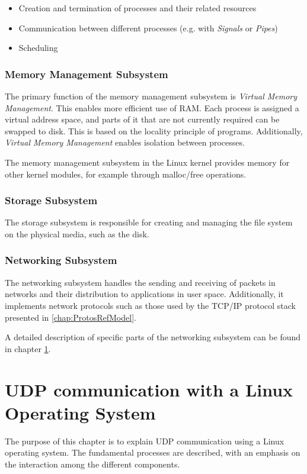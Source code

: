 \begin{itemize}
\item Creation and termination of processes and their related resources
\item Communication between different processes (e.g. with \textit{Signals} or \textit{Pipes})
\item Scheduling
\end{itemize}

\subsubsection{Memory Management Subsystem}
The primary function of the memory management subsystem is \textit{Virtual Memory Management}. This enables more efficient use of RAM. Each process is assigned a virtual address space, and parts of it that are not currently required can be swapped to disk. This is based on the locality principle of programs. Additionally, \textit{Virtual Memory Management} enables isolation between processes.

The memory management subsystem in the Linux kernel provides memory for other kernel modules, for example through malloc/free operations.

\subsubsection{Storage Subsystem}
The storage subsystem is responsible for creating and managing the file system on the physical media, such as the disk.


\subsubsection{Networking Subsystem}
The networking subsystem handles the sending and receiving of packets in networks and their distribution to applications in user space. Additionally, it implements network protocols such as those used by the TCP/IP protocol stack presented in \ref{chap:ProtosRefModel}.

A detailed description of specific parts of the networking subsystem can be found in chapter \ref{chap:LinuxUDPNWStack}.







\section{UDP communication with a Linux Operating System} \label{chap:LinuxUDPNWStack}
The purpose of this chapter is to explain UDP communication using a Linux operating system. The fundamental processes are described, with an emphasis on the interaction among the different components.

